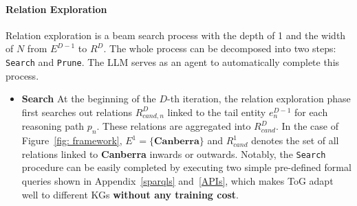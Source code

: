 \documentclass{article} %
\begin{document}
\paragraph{Relation Exploration}
\label{sec: relation_exploration}
Relation exploration is a beam search process with the depth of 1 and the width of $N$ from $E^{D-1}$ to $R^{D}$. 
The whole process can be decomposed into two steps: \texttt{Search} and \texttt{Prune}. The LLM serves as an agent to automatically complete this process.
\begin{itemize}[leftmargin=*]


    
    \item \textbf{Search} 
    At the beginning of the $D$-th iteration, the relation exploration phase first searches out relations $R^{D}_{cand,n}$ linked to the tail entity $e^{D-1}_{n}$ for each reasoning path $p_n$. These relations are aggregated into $R^{D}_{cand}$. In the case of Figure~\ref{fig: framework}, $E^{1}=\{\textbf{Canberra}\}$ and $R^{1}_{cand}$ denotes the set of all relations linked to \textbf{Canberra} inwards or outwards. Notably, the \texttt{Search} procedure can be easily completed by executing two simple pre-defined formal queries shown in Appendix~\ref{sparqls} and~\ref{APIs}, which makes ToG adapt well to different KGs \textbf{without any training cost}.
    

\end{itemize}
\end{document}
